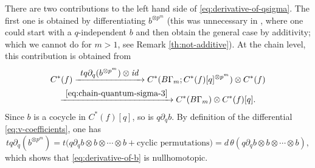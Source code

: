 \documentclass[JEP,XML,SOM,Unicode,NoFloatCountersInSection,published]{cedram}
\newcommand\To[1]{\mathchoice{\xrightarrow{\textstyle\kern4pt#1\kern3pt}}{\stackrel{#1}{\longrightarrow}}{}{}}
\theoremstyle{plain}
\theoremstyle{definition}
\begin{document}
There are two contributions to the left hand side of \eqref{eq:derivative-of-qsigma}. The first one is obtained by differentiating $b^{\otimes p^m}$ (this was unnecessary in \cite{seidel-wilkins21}, where one could start with a $q$-independent $b$ and then obtain the general case by additivity; which we cannot do for $m>1$, see Remark \ref{th:not-additive}). At the chain level, this contribution is obtained from
\begin{multline}\label{eq:derivative-of-b}
C^*(f) \To{t q\partial_q(b^{\otimes p^m}) \otimes \mathit{id}}
C^*(B\Gamma_m;C^*(f)[q]^{\otimes p^m}) \otimes C^*(f)
\\
\To{\eqref{eq:chain-quantum-sigma-3}}
C^*(B\Gamma_m) \otimes C^*(f)[q].
\end{multline}
Since $b$ is a cocycle in $C^*(f)[q]$, so is $q\partial_q b$. By definition of the differential \eqref{eq:v-coefficients}, one has
\begin{equation*}
tq\partial_q(b^{\otimes p^m}) = t\bigl(q\partial_q b \otimes b \otimes \cdots \otimes b +
\text{cyclic permutations}\bigr) = d\, \theta(q\partial_qb \otimes b \otimes \cdots \otimes b),
\end{equation*}
which shows that \eqref{eq:derivative-of-b} is nullhomotopic.
\end{document}
